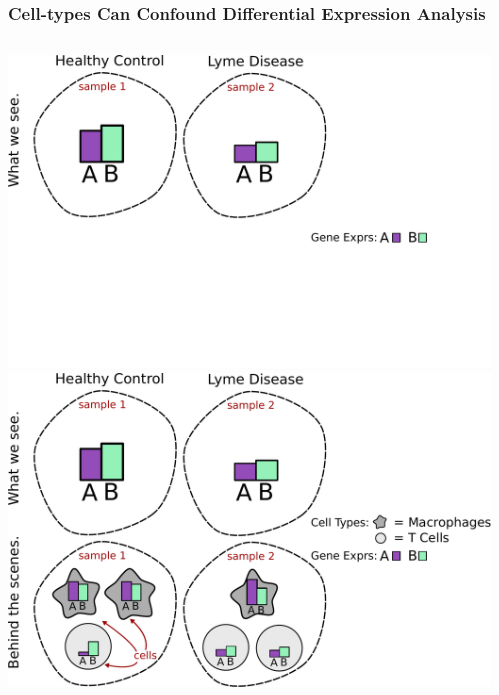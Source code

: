 \documentclass[usenames,dvipsnames,15pt]{beamer}
\begin{document}
\begin{frame}
  \frametitle{Cell-types Can Confound Differential Expression Analysis}
  \begin{columns}
    \begin{column}{.6\textwidth}
  \begin{center}\begin{minipage}{\columnwidth}
    \centering
    \begin{overprint}
      \includegraphics[scale=.38]{pictures/confound}
      \includegraphics[scale=.38]{pictures/confound2}
    \end{overprint}
  \end{minipage}
  \end{center}
    \end{column}
    \begin{column}{.4\textwidth}\vspace{-1.7cm}


\end{column}
\end{columns}
\end{frame}
\end{document}
